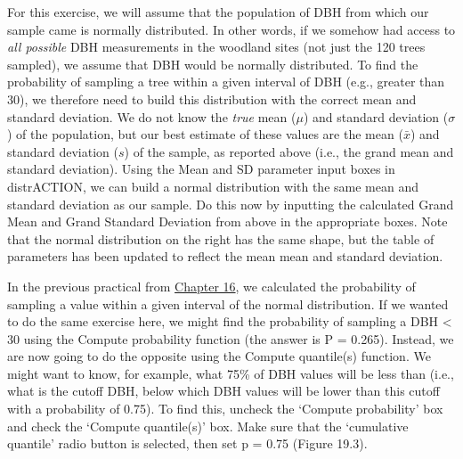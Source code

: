 \documentclass[
]{scrbook}
\begin{document}
For this exercise, we will assume that the population of DBH from which our sample came is normally distributed.
In other words, if we somehow had access to \emph{all possible} DBH measurements in the woodland sites (not just the 120 trees sampled), we assume that DBH would be normally distributed.
To find the probability of sampling a tree within a given interval of DBH (e.g., greater than 30), we therefore need to build this distribution with the correct mean and standard deviation.
We do not know the \emph{true} mean (\(\mu\)) and standard deviation (\(\sigma\)) of the population, but our best estimate of these values are the mean (\(\bar{x}\)) and standard deviation (\(s\)) of the sample, as reported above (i.e., the grand mean and standard deviation).
Using the Mean and SD parameter input boxes in distrACTION, we can build a normal distribution with the same mean and standard deviation as our sample.
Do this now by inputting the calculated Grand Mean and Grand Standard Deviation from above in the appropriate boxes.
Note that the normal distribution on the right has the same shape, but the table of parameters has been updated to reflect the mean mean and standard deviation.

In the previous practical from \protect\hyperlink{Chapter_16}{Chapter 16}, we calculated the probability of sampling a value within a given interval of the normal distribution.
If we wanted to do the same exercise here, we might find the probability of sampling a DBH \textless{} 30 using the Compute probability function (the answer is P = 0.265).
Instead, we are now going to do the opposite using the Compute quantile(s) function.
We might want to know, for example, what 75\% of DBH values will be less than (i.e., what is the cutoff DBH, below which DBH values will be lower than this cutoff with a probability of 0.75).
To find this, uncheck the `Compute probability' box and check the `Compute quantile(s)' box.
Make sure that the `cumulative quantile' radio button is selected, then set p = 0.75 (Figure 19.3).
\end{document}
